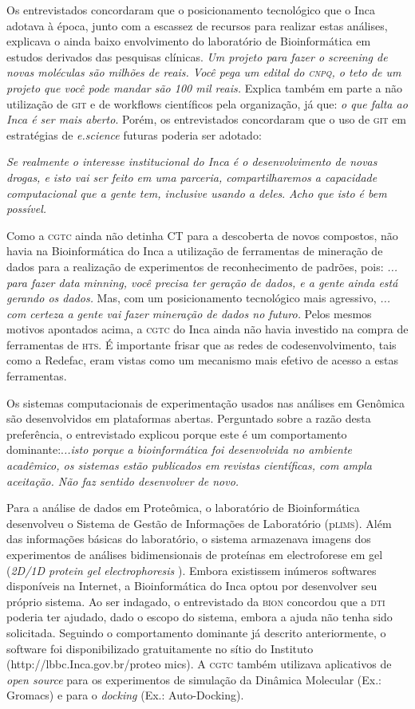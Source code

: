 \documentclass{article}
\begin{document}
Os entrevistados concordaram que o posicionamento tecnológico que o Inca adotava
à época, junto com a escassez de recursos para realizar estas análises,
explicava o ainda baixo envolvimento do laboratório de Bioinformática em estudos
derivados das pesquisas clínicas. \textit{Um projeto para fazer o screening de
novas moléculas são milhões de reais. Você pega um edital do \textsc{cnpq}, o teto de um
projeto que você pode mandar são 100 mil reais.}
Explica também em parte a não utilização de \textsc{git} e de workflows científicos pela
organização, já que: \textit{o que falta ao Inca é ser mais aberto}. Porém, os entrevistados concordaram que o uso de \textsc{git} em estratégias de
\textit{e.science}
futuras poderia ser adotado:

\textit{Se realmente o interesse institucional do Inca é o desenvolvimento de
novas drogas, e isto vai ser feito em uma parceria, compartilharemos a
capacidade computacional que a gente tem, inclusive usando a deles}. \textit{Acho que isto é bem possível.}

Como a \textsc{cgtc} ainda não detinha CT para a descoberta de novos compostos, não havia
na Bioinformática do Inca a utilização de ferramentas de mineração de dados para
a realização de experimentos de reconhecimento de padrões, pois: \textit{...
para fazer data minning, você precisa ter geração de dados, e a gente ainda está
gerando os dados.}
Mas, com um posicionamento tecnológico mais agressivo, \textit{... com certeza a
gente vai fazer mineração de dados no futuro.}
Pelos mesmos motivos apontados acima, a \textsc{cgtc} do Inca ainda não havia investido
na compra de ferramentas de \textsc{hts}. É importante frisar que as redes de
codesenvolvimento, tais como a Redefac, eram vistas como um mecanismo mais
efetivo de acesso a estas ferramentas.

Os sistemas computacionais de experimentação usados nas análises em Genômica são
desenvolvidos em plataformas abertas. Perguntado sobre a razão desta
preferência, o entrevistado explicou porque este é um comportamento dominante:.\textit{..isto porque a bioinformática foi desenvolvida no ambiente acadêmico,
os sistemas estão publicados em revistas científicas, com ampla aceitação. Não
faz sentido desenvolver de novo.}

Para a análise de dados em Proteômica, o laboratório de Bioinformática
desenvolveu o Sistema de Gestão de Informações de Laboratório (p\textsc{lims}). Além das
informações básicas do laboratório, o sistema armazenava imagens dos
experimentos de análises bidimensionais de proteínas em electroforese em gel
(\textit{2D/1D protein gel electrophoresis}
). Embora existissem inúmeros softwares disponíveis na Internet, a
Bioinformática do Inca optou por desenvolver seu próprio sistema. Ao ser
indagado, o entrevistado da \textsc{bion} concordou que a \textsc{dti} poderia ter ajudado, dado o
escopo do sistema, embora a ajuda não tenha sido solicitada. Seguindo o
comportamento dominante já descrito anteriormente, o software foi
disponibilizado gratuitamente no sítio do Instituto
(http://lbbc.Inca.gov.br/proteo mics). A \textsc{cgtc} também utilizava aplicativos de
\textit{open source}
para os experimentos de simulação da Dinâmica Molecular (Ex.: Gromacs) e para o
\textit{docking}
(Ex.: Auto-Docking).
\end{document}
